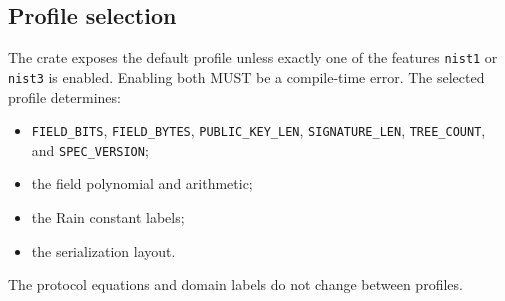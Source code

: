 \documentclass[11pt,a4paper]{article}
\begin{document}
\begin{table}[ht]
\centering
\small
\caption{Normative profile parameters.}
\label{tab:params}
\end{table}

\subsection{Profile selection}

The crate exposes the default profile unless exactly one of the features
\texttt{nist1} or \texttt{nist3} is enabled. Enabling both MUST be a
compile-time error. The selected profile determines:
\begin{itemize}
  \item \texttt{FIELD\_BITS}, \texttt{FIELD\_BYTES}, \texttt{PUBLIC\_KEY\_LEN},
        \texttt{SIGNATURE\_LEN}, \texttt{TREE\_COUNT}, and
        \texttt{SPEC\_VERSION};
  \item the field polynomial and arithmetic;
  \item the Rain constant labels;
  \item the serialization layout.
\end{itemize}
The protocol equations and domain labels do not change between profiles.
\end{document}
